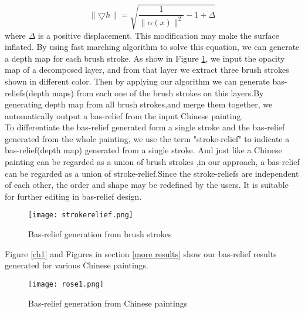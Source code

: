 \begin{equation}
\lVert \bigtriangledown h \rVert = \sqrt{\frac{1}{\lVert \alpha(x) \rVert ^2}-1+ \Delta}
\end{equation}
where $\Delta$ is a positive displacement. This modification may make the surface inflated. By using fast marching algorithm \cite{sethian1999level} to solve this equation, we can generate a depth map for each brush stroke. As show in Figure \ref{strokerelief}, we input the opacity map of a decomposed layer, and from that layer we extract three brush strokes shown in different color. Then by applying our algorithm we can generate bas-reliefs(depth maps) from each one of the brush strokes on this layers.By generating depth map from all brush strokes,and merge them together, we automatically output a bas-relief from the input Chinese painting. \\
To differentiate the bas-relief generated form a single stroke and the bas-relief generated from the whole painting, we use the term "stroke-relief" to indicate a bas-relief(depth map) generated from a single stroke. And just like a Chinese painting can be regarded as a union of brush strokes \cite{xu2006animating} ,in our approach, a bas-relief can be regarded as a union of stroke-relief.Since the stroke-reliefs are independent of each other, the order and shape may be redefined by the users. It is suitable for further editing in bas-relief design.
\begin{figure}[H]
	\centering
	\texttt{[image: strokerelief.png]}
	\caption{Bas-relief generation from brush strokes}
	\label{strokerelief}
\end{figure}

Figure \ref{ch1} and Figures in section \ref{more results} show our bas-relief results generated for various Chinese paintings. 

\begin{figure}[H]
	\centering
	\texttt{[image: rose1.png]}
	\caption{Bas-relief generation from Chinese paintings}
\end{figure}\label{ch1}

